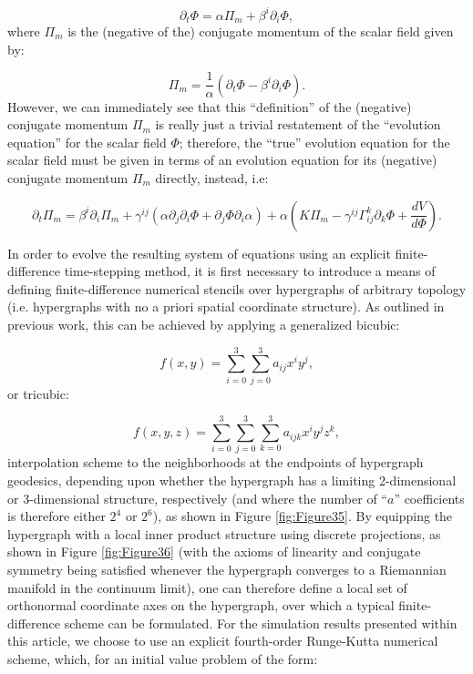 \documentclass{article}
\begin{document}
\begin{equation}
\partial_t \Phi = \alpha \Pi_{m} + \beta^i \partial_i \Phi,
\end{equation}
where ${\Pi_m}$ is the (negative of the) conjugate momentum of the scalar field given by:

\begin{equation}
\Pi_m = \frac{1}{\alpha} \left( \partial_t \Phi - \beta^i \partial_i \Phi \right).
\end{equation}
However, we can immediately see that this ``definition'' of the (negative) conjugate momentum ${\Pi_m}$ is really just a trivial restatement of the ``evolution equation'' for the scalar field ${\Phi}$; therefore, the ``true'' evolution equation for the scalar field must be given in terms of an evolution equation for its (negative) conjugate momentum ${\Pi_m}$ directly, instead, i.e:

\begin{equation}
\partial_t \Pi_m = \beta^i \partial_i \Pi_m + \gamma^{i j} \left( \alpha \partial_j \partial_i \Phi + \partial_j \Phi \partial_i \alpha \right) + \alpha \left( K \Pi_m - \gamma^{i j} \Gamma_{i j}^{k} \partial_k \Phi + \frac{d V}{d \Phi} \right).
\end{equation}

In order to evolve the resulting system of equations using an explicit finite-difference time-stepping method, it is first necessary to introduce a means of defining finite-difference numerical stencils over hypergraphs of arbitrary topology (i.e. hypergraphs with no a priori spatial coordinate structure). As outlined in previous work\cite{gorard4}, this can be achieved by applying a generalized bicubic:

\begin{equation}
f \left( x, y \right) = \sum_{i = 0}^{3} \sum_{j = 0}^{3} a_{i j} x^i y^j,
\end{equation}
or tricubic\cite{lekien}:

\begin{equation}
f \left( x, y, z \right) = \sum_{i = 0}^{3} \sum_{j = 0}^{3} \sum_{k = 0}^{3} a_{i j k} x^i y^j z^k,
\end{equation}
interpolation scheme to the neighborhoods at the endpoints of hypergraph geodesics, depending upon whether the hypergraph has a limiting 2-dimensional or 3-dimensional structure, respectively (and where the number of ``$a$'' coefficients is therefore either ${2^4}$ or ${2^6}$), as shown in Figure \ref{fig:Figure35}. By equipping the hypergraph with a local inner product structure using discrete projections, as shown in Figure \ref{fig:Figure36} (with the axioms of linearity and conjugate symmetry being satisfied whenever the hypergraph converges to a Riemannian manifold in the continuum limit), one can therefore define a local set of orthonormal coordinate axes on the hypergraph, over which a typical finite-difference scheme can be formulated. For the simulation results presented within this article, we choose to use an explicit fourth-order Runge-Kutta numerical scheme, which, for an initial value problem of the form:
\end{document}
